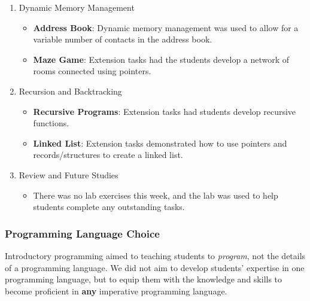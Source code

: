 \begin{enumerate}
  \item Dynamic Memory Management
  \begin{itemize}[noitemsep,nolistsep]
  	\item \textbf{Address Book}: Dynamic memory management was used to allow for a variable number of contacts in the address book.
  	\item \textbf{Maze Game}: Extension tasks had the students develop a network of rooms connected using pointers.
  \end{itemize}

  \item Recursion and Backtracking
  \begin{itemize}[noitemsep,nolistsep]
  	\item \textbf{Recursive Programs}: Extension tasks had students develop recursive functions.
  	\item \textbf{Linked List}: Extension tasks demonstrated how to use pointers and records/structures to create a linked list.
  \end{itemize}

  \item Review and Future Studies
  \begin{itemize}[noitemsep,nolistsep]
  	\item There was no lab exercises this week, and the lab was used to help students complete any outstanding tasks.
  \end{itemize}
\end{enumerate}


\subsubsection{Programming Language Choice} %
\label{ssub:programming_language_choice}

Introductory programming aimed to teaching students to \emph{program}, not the details of a programming language. We did not aim to develop students' expertise in one programming language, but to equip them with the knowledge and skills to become proficient in \textbf{any} imperative programming language.

